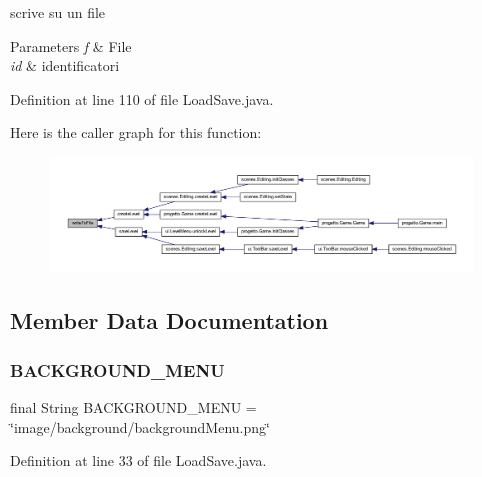 scrive su un file 


\begin{DoxyParams}{Parameters}
{\em f} & File \\
\hline
{\em id} & identificatori \\
\hline
\end{DoxyParams}


Definition at line 110 of file Load\+Save.\+java.

Here is the caller graph for this function\+:
\nopagebreak
\begin{figure}[H]
\begin{center}
\leavevmode
\includegraphics[width=350pt]{classhelpz_1_1_load_save_a953963a355bc62c6a3c1fdb51851d796_icgraph}
\end{center}
\end{figure}


\subsection{Member Data Documentation}
\mbox{\label{classhelpz_1_1_load_save_aa3d77f674caa25e1212a9469f7f3f86e}} 
\subsubsection{\texorpdfstring{B\+A\+C\+K\+G\+R\+O\+U\+N\+D\+\_\+\+M\+E\+NU}{BACKGROUND\_MENU}}
{\footnotesize\ttfamily final String B\+A\+C\+K\+G\+R\+O\+U\+N\+D\+\_\+\+M\+E\+NU = \char`\"{}image/background/background\+Menu.\+png\char`\"{}\hspace{0.3cm}{\ttfamily [static]}}



Definition at line 33 of file Load\+Save.\+java.

\mbox{\label{classhelpz_1_1_load_save_aa62695e0c0c7e0a290f0b290c526acd0}} 

